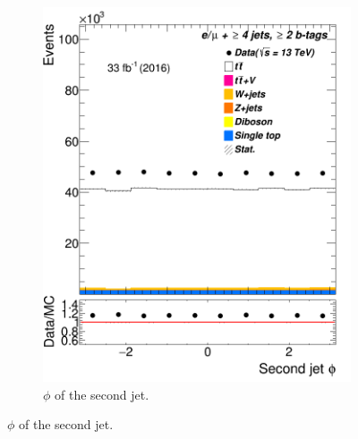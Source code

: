 \begin{figure}
\begin{subfigure}{0.25\textwidth}
	\includegraphics[width=\linewidth]{ControlPlots_emujets_2016_4incl_2incl/jet1_phi_emujets_2016.png}
	\caption{$\phi$ of the second jet.} \label{fig:d3}
\end{subfigure}





\end{figure}
